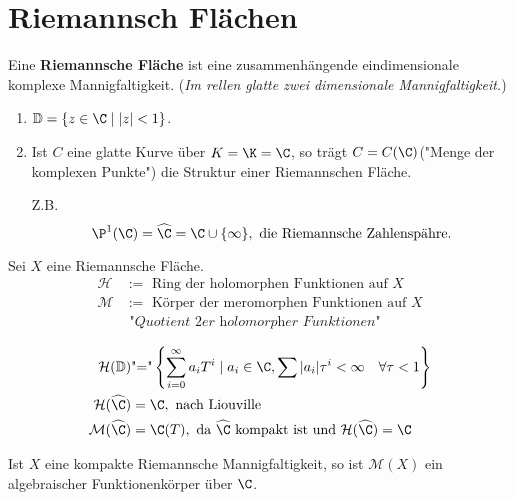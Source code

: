 \section{Riemannsch Flächen}
\begin{definition}
    Eine \textbf{Riemannsche Fläche} ist eine zusammenhängende eindimensionale komplexe Mannigfaltigkeit.
    (\textit{Im rellen glatte zwei dimensionale Mannigfaltigkeit.})
\end{definition}

\begin{beispiel}
    \begin{enumerate}[label=\alph*.)]
        \item $\mathbb{D} = \{z \in \C \mid |z| < 1\}$.
        \item Ist $C$ eine glatte Kurve über $K = \K = \C$, so trägt $C = C(\C)$("Menge der komplexen Punkte")
        die Struktur einer Riemannschen Fläche.

        Z.B. $$ \P^1(\C) = \widehat{\C} = \C \cup \{\infty\}, \text{ die Riemannsche Zahlenspähre.}$$
    \end{enumerate}
\end{beispiel}

\begin{definition}
    Sei $X$ eine Riemannsche Fläche.
    \begin{align*}
        \mathcal{H} &:= \text{ Ring der holomorphen Funktionen auf }X\\
        \mathcal{M} &:= \text{ Körper der meromorphen Funktionen auf }X \\
        &\textit{ "Quotient 2er holomorpher Funktionen"}
    \end{align*}
\end{definition}

\begin{beispiel}
    \begin{align*}
        \mathcal{H}(\mathbb{D}) & \text{"="} \left\{\sum\limits_{i=0}^\infty a_i T^i \mid a_i \in \C, 
            \sum|a_i|\tau^i < \infty \quad \forall \tau < 1\right\}\\
        \mathcal{H}(\widehat{\C}) & = \C, \text{ nach Liouville}\\
        \mathcal{M}(\widehat{\C}) & = \C(T), \text{ da } \widehat{\C} \text{ kompakt ist und }
            \mathcal{H}(\widehat{\C}) = \C
    \end{align*}
\end{beispiel}

\begin{theorem}
    Ist $X$ eine kompakte Riemannsche Mannigfaltigkeit, so ist $\mathcal{M}(X)$ ein algebraischer Funktionenkörper über $\C$.
\end{theorem}

